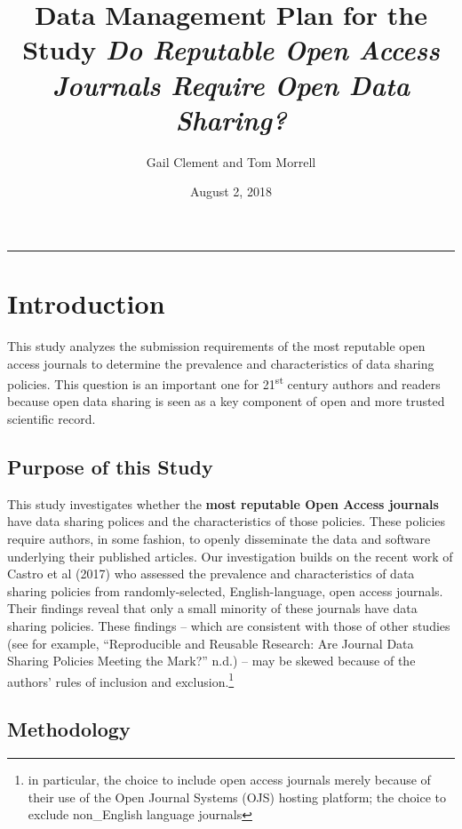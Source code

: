 \documentclass[]{article}
\title{Data Management Plan for the Study \emph{Do Reputable Open Access
Journals Require Open Data Sharing?}}
\author{Gail Clement and Tom Morrell}
\date{August 2, 2018}
\let\rmarkdownfootnote\footnote%
\def\footnote{\protect\rmarkdownfootnote}
\begin{document}
\maketitle

{
\setcounter{tocdepth}{2}
\tableofcontents
}
\begin{center}\rule{0.5\linewidth}{\linethickness}\end{center}

\hypertarget{introduction}{%
\section{Introduction}\label{introduction}}

This study analyzes the submission requirements of the most reputable
open access journals to determine the prevalence and characteristics of
data sharing policies. This question is an important one for
21\textsuperscript{st} century authors and readers because open data
sharing is seen as a key component of open and more trusted scientific
record.

\hypertarget{purpose-of-this-study}{%
\subsection{Purpose of this Study}\label{purpose-of-this-study}}

This study investigates whether the \textbf{most reputable Open Access
journals} have data sharing polices and the characteristics of those
policies. These policies require authors, in some fashion, to openly
disseminate the data and software underlying their published articles.
Our investigation builds on the recent work of Castro et al (2017) who
assessed the prevalence and characteristics of data sharing policies
from randomly-selected, English-language, open access journals. Their
findings reveal that only a small minority of these journals have data
sharing policies. These findings -- which are consistent with those of
other studies (see for example, ``Reproducible and Reusable Research:
Are Journal Data Sharing Policies Meeting the Mark?'' n.d.) -- may be
skewed because of the authors' rules of inclusion and
exclusion.\footnote{in particular, the choice to include open access
  journals merely because of their use of the Open Journal Systems (OJS)
  hosting platform; the choice to exclude non\_English language journals}

\hypertarget{methodology}{%
\subsection{Methodology}\label{methodology}}
\end{document}
